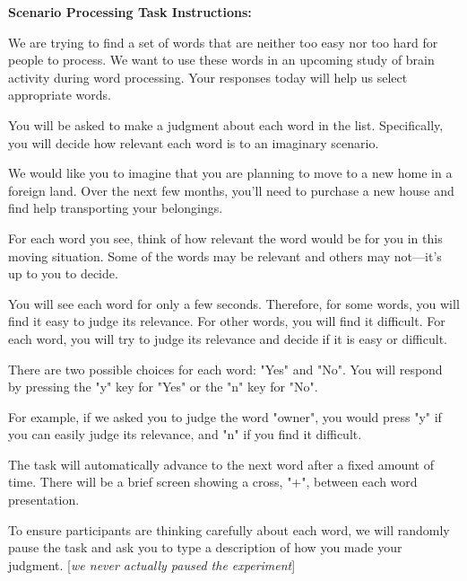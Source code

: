 
\textbf{Scenario Processing Task Instructions:}

\begin{displayquote}


We are trying to find a set of words that are neither too easy nor too hard for people to process.
            We want to use these words in an upcoming study of brain activity during word processing.
            Your responses today will help us select appropriate words.

        You will be asked to make a judgment about each word in the list.
            Specifically, you will decide how relevant each word is to an imaginary scenario.

        We would like you to imagine that you are planning to move to a new home in a foreign land.
            Over the next few months, you’ll need to purchase a new house and find help transporting your belongings.

        For each word you see, think of how relevant the word would be for you in this moving situation.
        Some of the words may be relevant and others may not---it’s up to you to decide.


        You will see each word for only a few seconds.
            Therefore, for some words, you will find it easy to judge its relevance.
            For other words, you will find it difficult. For each word, you will try to judge its relevance
            and decide if it is easy or difficult.

        There are two possible choices for each word: "Yes" and "No".
            You will respond by pressing the "y" key for "Yes" or the "n" key for "No".

        For example, if we asked you to judge the word "owner",
            you would press "y" if you can easily judge its relevance, and "n" if you find it difficult.

        The task will automatically advance to the next word after a fixed amount of time.
            There will be a brief screen showing a cross, "+", between each word presentation.

        To ensure participants are thinking carefully about each word, we will
          randomly pause the task and ask you to type a description of how you made your judgment. [\emph{we never actually paused the experiment}]

\end{displayquote}





